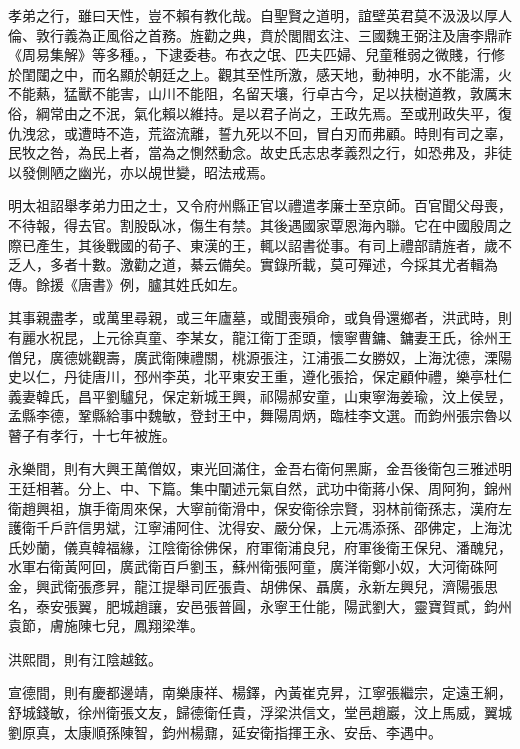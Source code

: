 
\begin{pinyinscope}
孝弟之行，雖曰天性，豈不賴有教化哉。自聖賢之道明，誼壁英君莫不汲汲以厚人倫、敦行義為正風俗之首務。旌勸之典，賁於閭閻玄注、三國魏王弼注及唐李鼎祚《周易集解》等多種。，下逮委巷。布衣之氓、匹夫匹婦、兒童稚弱之微賤，行修於閨闥之中，而名顯於朝廷之上。觀其至性所激，感天地，動神明，水不能濡，火不能爇，猛獸不能害，山川不能阻，名留天壤，行卓古今，足以扶樹道教，敦厲末俗，綱常由之不泯，氣化賴以維持。是以君子尚之，王政先焉。至或刑政失平，復仇洩忿，或遭時不造，荒盜流離，誓九死以不回，冒白刃而弗顧。時則有司之辜，民牧之咎，為民上者，當為之惻然動念。故史氏志忠孝義烈之行，如恐弗及，非徒以發側陋之幽光，亦以覘世變，昭法戒焉。

明太祖詔舉孝弟力田之士，又令府州縣正官以禮遣孝廉士至京師。百官聞父母喪，不待報，得去官。割股臥冰，傷生有禁。其後遇國家覃恩海內聯。它在中國殷周之際已產生，其後戰國的荀子、東漢的王，輒以詔書從事。有司上禮部請旌者，歲不乏人，多者十數。激勸之道，綦云備矣。實錄所載，莫可殫述，今採其尤者輯為傳。餘援《唐書》例，臚其姓氏如左。

其事親盡孝，或萬里尋親，或三年廬墓，或聞喪殞命，或負骨還鄉者，洪武時，則有麗水祝昆，上元徐真童、李某女，龍江衛丁歪頭，懷寧曹鏞、鏞妻王氏，徐州王僧兒，廣德姚觀壽，廣武衛陳禮關，桃源張注，江浦張二女勝奴，上海沈德，溧陽史以仁，丹徒唐川，邳州李英，北平東安王重，遵化張拾，保定顧仲禮，樂亭杜仁義妻韓氏，昌平劉驢兒，保定新城王興，祁陽郝安童，山東寧海姜瑜，汶上侯昱，孟縣李德，鞏縣給事中魏敏，登封王中，舞陽周炳，臨桂李文選。而鈞州張宗魯以瞽子有孝行，十七年被旌。

永樂間，則有大興王萬僧奴，東光回滿住，金吾右衛何黑廝，金吾後衛包三雅述明王廷相著。分上、中、下篇。集中闡述元氣自然，武功中衛蔣小保、周阿狗，錦州衛趙興祖，旗手衛周來保，大寧前衛滑中，保安衛徐宗賢，羽林前衛孫志，漢府左護衛千戶許信男斌，江寧浦阿住、沈得安、嚴分保，上元馮添孫、邵佛定，上海沈氏妙蘭，儀真韓福緣，江陰衛徐佛保，府軍衛浦良兒，府軍後衛王保兒、潘醜兒，水軍右衛黃阿回，廣武衛百戶劉玉，蘇州衛張阿童，廣洋衛鄭小奴，大河衛硃阿金，興武衛張彥昇，龍江提舉司匠張貴、胡佛保、聶廣，永新左興兒，濟陽張思名，泰安張翼，肥城趙讓，安邑張普圓，永寧王仕能，陽武劉大，靈寶賀貳，鈞州袁節，膚施陳七兒，鳳翔梁準。

洪熙間，則有江陰越鉉。

宣德間，則有慶都邊靖，南樂康祥、楊鐸，內黃崔克昇，江寧張繼宗，定遠王絅，舒城錢敏，徐州衛張文友，歸德衛任貴，浮梁洪信文，堂邑趙巖，汶上馬威，翼城劉原真，太康順孫陳智，鈞州楊鼐，延安衛指揮王永、安岳、李遇中。


\end{pinyinscope}
